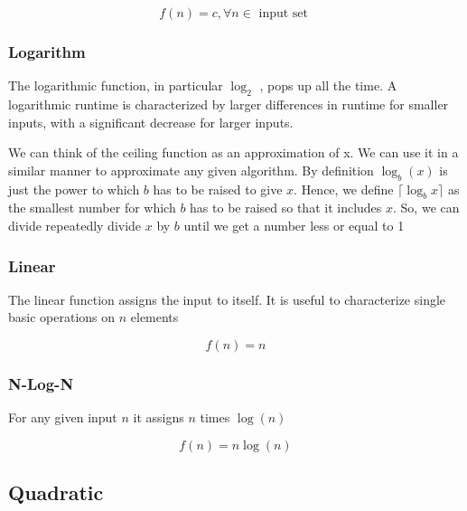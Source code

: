 	$$f(n) = c , \forall n \in \text{ input set }$$


\subsubsection{Logarithm}

	\par{The logarithmic function, in particular $\log_2$ , pops up all the
	time. A logarithmic runtime is characterized by larger differences in
	runtime for smaller inputs, with a significant decrease for larger inputs.}



	\par{We can think of the ceiling function as an approximation of x. We can
			use it in a similar manner to approximate any given algorithm. By
			definition $\log_b(x)$ is just the power to which $b$ has to be
			raised to give $x$. Hence, we define $\lceil\log_b x\rceil$ as the
	smallest number for which $b$ has to be raised so that it includes $x$. So,
	we can divide repeatedly divide $x$ by $b$ until we get a number less or
	equal to 1} 
	

\subsubsection{Linear}

	\par{The linear function assigns the input to itself. It is useful to
	characterize single basic operations on $n$ elements}

	$$f(n) = n$$

\subsubsection{N-Log-N}

	\par{For any given input $n$ it assigns $n$ times $\log(n)$}

	$$f(n) = n\log(n)$$

\subsection{Quadratic}

